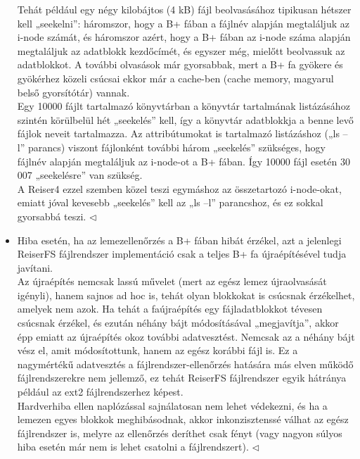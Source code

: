 \documentclass[tikz,12pt,margin=0px]{article}
\begin{document}
\begin{itemize}[topsep=8pt,itemsep=4pt,partopsep=4pt, parsep=4pt]
        {\footnotesize \noindent {\color{blue} \faLightbulbO\ $\triangleright$ } }
        {\footnotesize
        Tehát például egy négy kilobájtos (4 kB) fájl beolvasásához tipikusan hétszer kell „seekelni”: háromszor, hogy a B+ fában a fájlnév alapján megtaláljuk az i-node számát, és háromszor azért, hogy a B+ fában az i-node száma alapján megtaláljuk az adatblokk kezdőcímét, és egyszer még, mielőtt beolvassuk az adatblokkot.
        \noindent A további olvasások már gyorsabbak, mert a B+ fa gyökere és gyökérhez közeli csúcsai ekkor már a cache-ben (cache memory, magyarul belső gyorsítótár) vannak.\\
        \noindent Egy 10000 fájlt tartalmazó könyvtárban a könyvtár tartalmának listázásához szintén körülbelül hét „seekelés” kell, így a könyvtár adatblokkja a benne levő fájlok neveit tartalmazza. Az attribútumokat is tartalmazó listázáshoz („ls –l” parancs) viszont fájlonként további három „seekelés” szükséges, hogy fájlnév alapján megtaláljuk az i-node-ot a B+ fában. Így 10000 fájl esetén 30 007 „seekelésre” van szükség.\\
        \noindent A Reiser4 ezzel szemben közel teszi egymáshoz az összetartozó i-node-okat, emiatt jóval kevesebb „seekelés” kell az „ls –l” parancshoz, és ez sokkal gyorsabbá teszi.
        $\triangleleft$ \faLightbulbO}\\

        \item Hiba esetén, ha az lemezellenőrzés a B+ fában hibát érzékel, azt a jelenlegi ReiserFS fájlrendszer implementáció csak a teljes B+ fa újraépítésével tudja javítani.\\

        {\footnotesize \noindent {\color{blue} \faLightbulbO\ $\triangleright$ } }
        {\footnotesize
        \noindent Az újraépítés nemcsak lassú művelet (mert az egész lemez újraolvasását igényli), hanem sajnos ad hoc is, tehát olyan blokkokat is csúcsnak érzékelhet, amelyek nem azok. Ha tehát a faújraépítés egy fájladatblokkot tévesen csúcsnak érzékel, és ezután néhány bájt módosításával „megjavítja”, akkor épp emiatt az újraépítés okoz további adatvesztést. Nemcsak az a néhány bájt vész el, amit módosítottunk, hanem az egész korábbi fájl is. Ez a nagymértékű adatvesztés a fájlrendszer-ellenőrzés hatására más elven működő fájlrendszerekre nem jellemző, ez tehát ReiserFS fájlrendszer egyik hátránya például az ext2 fájlrendszerhez képest.\\
        \noindent Hardverhiba ellen naplózással sajnálatosan nem lehet védekezni, és ha a lemezen egyes blokkok meghibásodnak, akkor inkonzisztenssé válhat az egész fájlrendszer is, melyre az ellenőrzés deríthet csak fényt (vagy nagyon súlyos hiba esetén már nem is lehet csatolni a fájlrendszert).
        $\triangleleft$ \faLightbulbO}\\

    \end{itemize}
\end{document}
